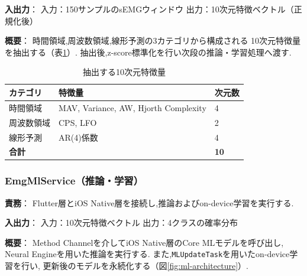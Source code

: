 \textbf{入出力}：
入力：150サンプルのsEMGウィンドウ  
出力：10次元特徴ベクトル（正規化後）

\textbf{概要}：
時間領域,周波数領域,線形予測の3カテゴリから構成される
10次元特徴量を抽出する（表\ref{tab:features}）.
抽出後,z-score標準化を行い次段の推論・学習処理へ渡す.
\begin{table}[htbp]
\centering
\caption{抽出する10次元特徴量}
\label{tab:features}
\begin{tabular}{lll}
\hline
\textbf{カテゴリ} & \textbf{特徴量} & \textbf{次元数} \\ \hline
時間領域 & MAV, Variance, AW, Hjorth Complexity & 4 \\
周波数領域 & CPS, LFO & 2 \\
線形予測 & AR(4)係数 & 4 \\ \hline
\multicolumn{2}{l}{\textbf{合計}} & \textbf{10} \\ \hline
\end{tabular}
\end{table}

\pagebreak
\subsubsection{EmgMlService（推論・学習）}
\label{subsubsec:ml-service}
\textbf{責務}：
Flutter層とiOS Native層を接続し,推論およびon-device学習を実行する.

\textbf{入出力}：
入力：10次元特徴ベクトル  
出力：4クラスの確率分布

\textbf{概要}：
Method Channelを介してiOS Native層のCore MLモデルを呼び出し,
Neural Engineを用いた推論を実行する.
また,\texttt{MLUpdateTask}を用いたon-device学習を行い,
更新後のモデルを永続化する（図\ref{fig:ml-architecture}）.

